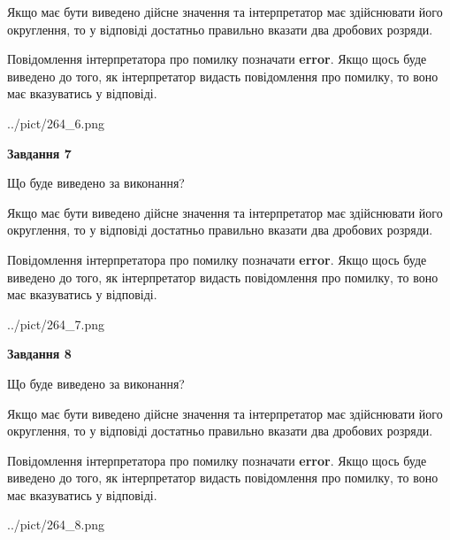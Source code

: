 \documentclass[12pt, ukrainian]{article}
\begin{document}
{\begin {Large}
Якщо має бути виведено дійсне значення та інтерпретатор має здійснювати його округлення, 
то у відповіді достатньо правильно вказати два дробових розряди.

Повідомлення інтерпретатора про помилку позначати \textbf{error}.
Якщо щось буде виведено до того, як інтерпретатор видасть повідомлення про помилку, 
то воно має вказуватись у відповіді. \par

\begin{center}
	{../pict/264_6.png}
\end{center}
\newpage

{\begin {center}\textbf{Завдання 7}\end {center}}\par
Що буде виведено за виконання? \par

Якщо має бути виведено дійсне значення та інтерпретатор має здійснювати його округлення, 
то у відповіді достатньо правильно вказати два дробових розряди.

Повідомлення інтерпретатора про помилку позначати \textbf{error}.
Якщо щось буде виведено до того, як інтерпретатор видасть повідомлення про помилку, 
то воно має вказуватись у відповіді. \par

\begin{center}
	{../pict/264_7.png}
\end{center}
\newpage

{\begin {center}\textbf{Завдання 8}\end {center}}\par
Що буде виведено за виконання? \par

Якщо має бути виведено дійсне значення та інтерпретатор має здійснювати його округлення, 
то у відповіді достатньо правильно вказати два дробових розряди.

Повідомлення інтерпретатора про помилку позначати \textbf{error}.
Якщо щось буде виведено до того, як інтерпретатор видасть повідомлення про помилку, 
то воно має вказуватись у відповіді. \par

\begin{center}
	{../pict/264_8.png}
\end{center}
\newpage


\end{Large}}
\end{document}
